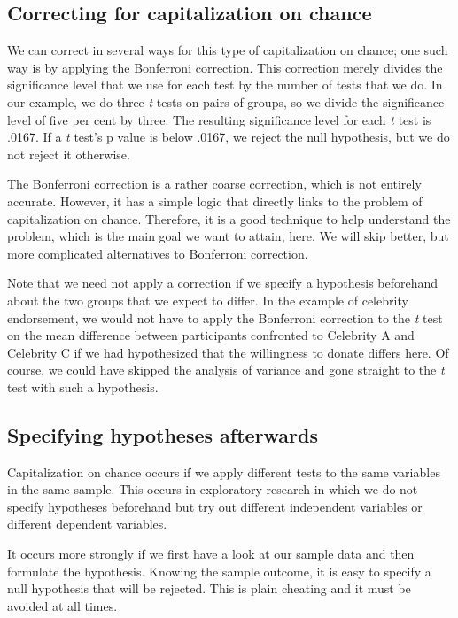 \documentclass[a4paper]{book}
\theoremstyle{definition}
\theoremstyle{definition}
\theoremstyle{definition}
\theoremstyle{remark}
\begin{document}
\subsection{Correcting for capitalization on
chance}\label{correcting-for-capitalization-on-chance}

We can correct in several ways for this type of capitalization on
chance; one such way is by applying the Bonferroni correction. This
correction merely divides the significance level that we use for each
test by the number of tests that we do. In our example, we do three
\emph{t} tests on pairs of groups, so we divide the significance level
of five per cent by three. The resulting significance level for each
\emph{t} test is .0167. If a \emph{t} test's p value is below .0167, we
reject the null hypothesis, but we do not reject it otherwise.

The Bonferroni correction is a rather coarse correction, which is not
entirely accurate. However, it has a simple logic that directly links to
the problem of capitalization on chance. Therefore, it is a good
technique to help understand the problem, which is the main goal we want
to attain, here. We will skip better, but more complicated alternatives
to Bonferroni correction.

Note that we need not apply a correction if we specify a hypothesis
beforehand about the two groups that we expect to differ. In the example
of celebrity endorsement, we would not have to apply the Bonferroni
correction to the \emph{t} test on the mean difference between
participants confronted to Celebrity A and Celebrity C if we had
hypothesized that the willingness to donate differs here. Of course, we
could have skipped the analysis of variance and gone straight to the
\emph{t} test with such a hypothesis.

\subsection{Specifying hypotheses
afterwards}\label{specifying-hypotheses-afterwards}

Capitalization on chance occurs if we apply different tests to the same
variables in the same sample. This occurs in exploratory research in
which we do not specify hypotheses beforehand but try out different
independent variables or different dependent variables.

It occurs more strongly if we first have a look at our sample data and
then formulate the hypothesis. Knowing the sample outcome, it is easy to
specify a null hypothesis that will be rejected. This is plain cheating
and it must be avoided at all times.
\end{document}
